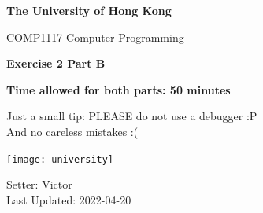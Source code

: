 \documentclass{exam}
\begin{document}
\thispagestyle{plain}
\begin{titlepage}
    \begin{center}
        \vspace*{1cm}
            
        \Huge
        \textbf{The University of Hong Kong}
            
        \vspace{0.5cm}
        \LARGE
        COMP1117 Computer Programming
                     
        \vspace{0.4cm}
        \textbf{Exercise 2 Part B}

        \vspace{0.4cm}
        \textbf{Time allowed for both parts: 50 minutes}
        
        \begin{center}
        \end{center}
            
        \vfill
        \Large    
        Just a small tip: PLEASE do not use a debugger :P\\
        And no careless mistakes :(
            
        \vspace{0.8cm}
            
        \texttt{[image: university]}
            
        \Large
        Setter: Victor\\
        Last Updated: 2022-04-20
    \end{center}
\end{titlepage}
\end{document}
